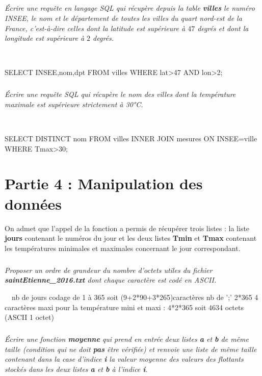\documentclass[10pt,fleqn]{article} %
\begin{document}
\subparagraph{} 
\textit{Écrire une requête en langage SQL qui récupère depuis la table 
	\textbf{villes} le numéro INSEE, le nom et le département de toutes les villes du quart 
	nord-est de la France, c'est-à-dire celles dont la latitude est supérieure 
	à $47$ degrés et dont la longitude est supérieure à $2$ degrés.}

\ifprof
\begin{corrige}~\
\begin{python}
SELECT INSEE,nom,dpt  FROM villes WHERE lat>47 AND lon>2;
\end{python}
\end{corrige}
\else
\fi

\subparagraph{}
\textit{Écrire une requête SQL qui récupère le nom des villes dont la température maximale est supérieure strictement à 30°C.}

\ifprof
\begin{corrige}~\
\begin{python}
SELECT DISTINCT nom FROM villes INNER JOIN mesures ON INSEE=ville WHERE Tmax>30;
\end{python}
\end{corrige}
\else
\fi

\section*{Partie 4 : Manipulation des données}

On admet que l'appel de la fonction a permis de récupérer trois listes : la liste \textbf{jours}
contenant le numéros du jour et  les deux listes \textbf{Tmin} et 
\textbf{Tmax} contenant les températures minimales et maximales concernant le jour 
correspondant.

\subparagraph{} 
\textit{Proposer un ordre de grandeur du nombre d'octets utiles du fichier 
\textbf{saintEtienne\_2016.txt} dont chaque caractère est codé en ASCII.}

\ifprof
\begin{corrige}~\
nb de jours codage de 1 à 365 soit (9+2*90+3*265)caractères
nb de ';' 2*365
4 caractères maxi pour la température mini et maxi : 4*2*365
soit 4634 octets (ASCII 1 octet)
\end{corrige}
\else
\fi
	
\subparagraph{} 
	\textit{Écrire une fonction \textbf{moyenne} qui prend en entrée deux listes 
	\textbf{a} et \textbf{b} de même taille (condition qui ne doit \textbf{pas} être vérifiée)
	 et renvoie une liste de même taille contenant dans 
	la case d'indice \textbf{i} la valeur moyenne des valeurs des flottants 
	stockés dans les deux listes \textbf{a} et \textbf{b} à l'indice \textbf{i}.}
	
\end{document}
